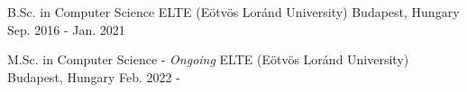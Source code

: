 

\begin{cventries}

  \cventry
    {B.Sc. in Computer Science} %
    {ELTE (Eötvös Loránd University)} %
    {Budapest, Hungary} %
    {Sep. 2016 - Jan. 2021 } %
    {
    }

  \cventry
    {M.Sc. in Computer Science - \textit{Ongoing}} %
    {ELTE (Eötvös Loránd University)} %
    {Budapest, Hungary} %
    {Feb. 2022 - } %
    {
    }

\end{cventries}
